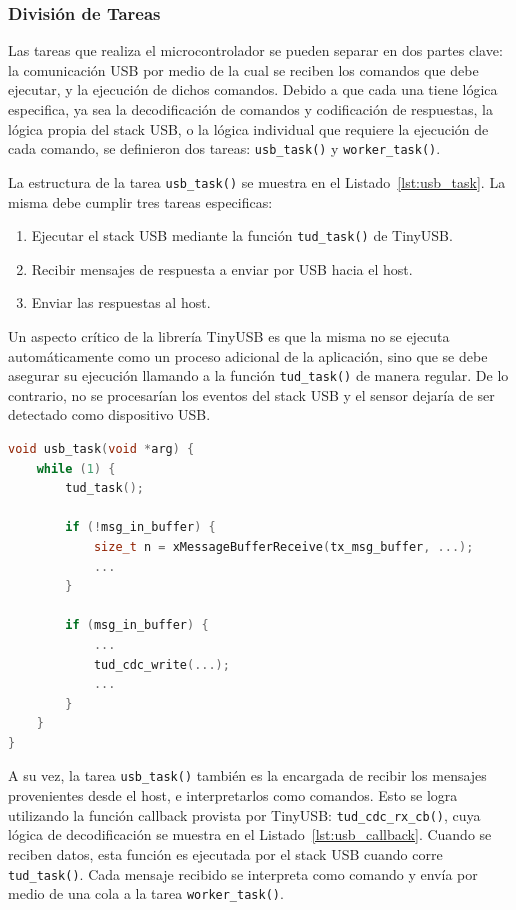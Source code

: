 \documentclass[12pt,a4paper,fleqn]{article}
\begin{document}
\subsubsection{División de Tareas}

Las tareas que realiza el microcontrolador se pueden separar en dos partes clave: la comunicación USB por medio de la cual se reciben los comandos que debe ejecutar, y la ejecución de dichos comandos. Debido a que cada una tiene lógica especifica, ya sea la decodificación de comandos y codificación de respuestas, la lógica propia del stack USB, o la lógica individual que requiere la ejecución de cada comando, se definieron dos tareas: \verb|usb_task()| y \verb|worker_task()|.

La estructura de la tarea \verb|usb_task()| se muestra en el Listado~\ref{lst:usb_task}. La misma debe cumplir tres tareas especificas:
\begin{enumerate}
    \item Ejecutar el stack USB mediante la función \verb|tud_task()| de TinyUSB.
    \item Recibir mensajes de respuesta a enviar por USB hacia el host.
    \item Enviar las respuestas al host.
\end{enumerate}

Un aspecto crítico de la librería TinyUSB es que la misma no se ejecuta automáticamente como un proceso adicional de la aplicación, sino que se debe asegurar su ejecución llamando a la función \verb|tud_task()| de manera regular. De lo contrario, no se procesarían los eventos del stack USB y el sensor dejaría de ser detectado como dispositivo USB.

\lstset{basicstyle=\small}
\begin{lstlisting}[language=c, caption={Estructura de la tarea encargada de la comunicación por USB.}, label={lst:usb_task}]
void usb_task(void *arg) {
    while (1) {
        tud_task();

        if (!msg_in_buffer) {
            size_t n = xMessageBufferReceive(tx_msg_buffer, ...);
            ...
        }

        if (msg_in_buffer) {
            ...
            tud_cdc_write(...);
            ...
        }
    }
}
\end{lstlisting}

A su vez, la tarea \verb|usb_task()| también es la encargada de recibir los mensajes provenientes desde el host, e interpretarlos como comandos. Esto se logra utilizando la función callback provista por TinyUSB: \verb|tud_cdc_rx_cb()|, cuya lógica de decodificación se muestra en el Listado~\ref{lst:usb_callback}. Cuando se reciben datos, esta función es ejecutada por el stack USB cuando corre \verb|tud_task()|. Cada mensaje recibido se interpreta como comando y envía por medio de una cola a la tarea \verb|worker_task()|.
\end{document}
